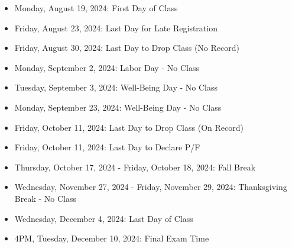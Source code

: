 \documentclass[11pt]{article}
\begin{document}
\begin{itemize}
    \item Monday, August 19, 2024: First Day of Class
    \item Friday, August 23, 2024: Last Day for Late Registration
    \item Friday, August 30, 2024: Last Day to Drop Class (No Record)
    \item Monday, September 2, 2024: Labor Day - No Class
    \item Tuesday, September 3, 2024: Well-Being Day - No Class
    \item Monday, September 23, 2024: Well-Being Day - No Class
    \item Friday, October 11, 2024: Last Day to Drop Class (On Record)
    \item Friday, October 11, 2024: Last Day to Declare P/F
    \item Thursday, October 17, 2024 - Friday, October 18, 2024: Fall Break
    \item Wednesday, November 27, 2024 - Friday, November 29, 2024: Thanksgiving Break - No Class
    \item Wednesday, December 4, 2024: Last Day of Class
    \item 4PM, Tuesday, December 10, 2024: Final Exam Time
\end{itemize}

\end{document}
